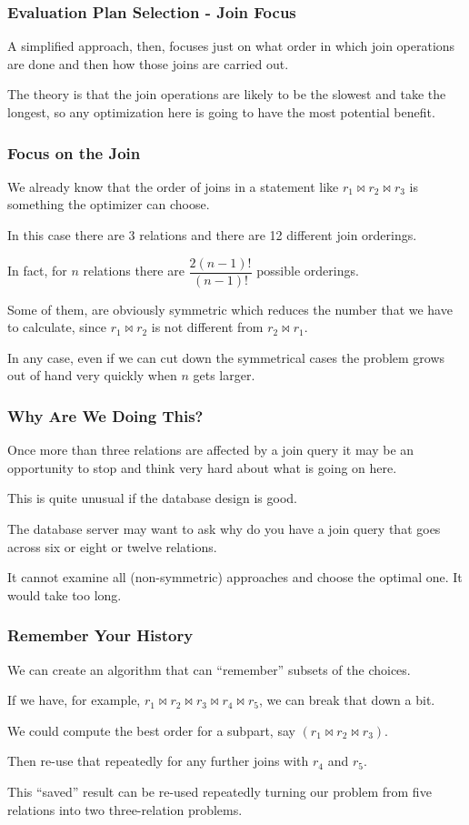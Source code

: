 \begin{frame}
\frametitle{Evaluation Plan Selection - Join Focus}

A simplified approach, then, focuses just on what order in which join operations are done and then how those joins are carried out. 

The theory is that the join operations are likely to be the slowest and take the longest, so any optimization here is going to have the most potential benefit.


\end{frame}

\begin{frame}
\frametitle{Focus on the Join}

We already know that the order of joins in a statement like $r_{1} \bowtie r_{2} \bowtie r_{3}$ is something the optimizer can choose. 

In this case there are 3 relations and there are 12 different join orderings. 

In fact, for $n$ relations there are $\dfrac{2(n-1)!}{(n-1)!}$ possible orderings. 

Some of them, are obviously symmetric which reduces the number that we have to calculate, since $r_{1} \bowtie r_{2}$ is not different from $r_{2} \bowtie r_{1}$. 

In any case, even if we can cut down the symmetrical cases the problem grows out of hand very quickly when $n$ gets larger.


\end{frame}


\begin{frame}
\frametitle{Why Are We Doing This?}

Once more than three relations are affected by a join query it may be an opportunity to stop and think very hard about what is going on here. 

This is quite unusual if the database design is good. 

The database server may want to ask why do you have a join query that goes across six or eight or twelve relations. 

It cannot examine all (non-symmetric) approaches and choose the optimal one. It would take too long.

\end{frame}


\begin{frame}
\frametitle{Remember Your History}

We can create an algorithm that can ``remember'' subsets of the choices. 

If we have, for example, $r_{1} \bowtie r_{2} \bowtie r_{3} \bowtie r_{4} \bowtie r_{5}$, we can break that down a bit. 

We could compute the best order for a subpart, say $(r_{1} \bowtie r_{2} \bowtie r_{3})$. 

Then re-use that repeatedly for any further joins with $r_{4}$ and $r_{5}$. 

This ``saved'' result can be re-used repeatedly turning our problem from five relations into two three-relation problems.

\end{frame}

